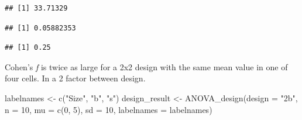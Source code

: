 \documentclass[
]{book}
\newenvironment{Shaded}{\begin{snugshade}}{\end{snugshade}}
\newcommand{\AttributeTok}[1]{\textcolor[rgb]{0.77,0.63,0.00}{#1}}
\newcommand{\CommentTok}[1]{\textcolor[rgb]{0.56,0.35,0.01}{\textit{#1}}}
\newcommand{\DecValTok}[1]{\textcolor[rgb]{0.00,0.00,0.81}{#1}}
\newcommand{\FunctionTok}[1]{\textcolor[rgb]{0.00,0.00,0.00}{#1}}
\newcommand{\NormalTok}[1]{#1}
\newcommand{\OtherTok}[1]{\textcolor[rgb]{0.56,0.35,0.01}{#1}}
\newcommand{\SpecialCharTok}[1]{\textcolor[rgb]{0.00,0.00,0.00}{#1}}
\newcommand{\StringTok}[1]{\textcolor[rgb]{0.31,0.60,0.02}{#1}}
\begin{document}
\begin{Shaded}
\end{Shaded}

\begin{verbatim}
## [1] 33.71329
\end{verbatim}

\begin{Shaded}
\end{Shaded}

\begin{verbatim}
## [1] 0.05882353
\end{verbatim}

\begin{Shaded}
\end{Shaded}

\begin{verbatim}
## [1] 0.25
\end{verbatim}

Cohen's \emph{f} is twice as large for a 2x2 design with the same mean value in one of four cells. In a 2 factor between design.

\begin{Shaded}
\begin{Highlighting}[]
\NormalTok{labelnames }\OtherTok{\textless{}{-}} \FunctionTok{c}\NormalTok{(}\StringTok{"Size"}\NormalTok{, }\StringTok{"b"}\NormalTok{, }\StringTok{"s"}\NormalTok{)}
\NormalTok{design\_result }\OtherTok{\textless{}{-}} \FunctionTok{ANOVA\_design}\NormalTok{(}\AttributeTok{design =} \StringTok{"2b"}\NormalTok{, }
                              \AttributeTok{n =} \DecValTok{10}\NormalTok{,  }
                              \AttributeTok{mu =} \FunctionTok{c}\NormalTok{(}\DecValTok{0}\NormalTok{, }\DecValTok{5}\NormalTok{), }
                              \AttributeTok{sd =} \DecValTok{10}\NormalTok{, }
                              \AttributeTok{labelnames =}\NormalTok{ labelnames) }
\end{Highlighting}
\end{Shaded}
\end{document}
